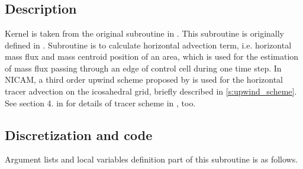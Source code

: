 \section{}

\subsection{Description}

Kernel  is taken from the original subroutine
 in \NICAM.
%
This subroutine is originally defined in .
%
Subroutine  is to calculate horizontal advection
term, i.e. horizontal mass flux and mass centroid position of an area,
which is used for the estimation of mass flux passing through an edge of control cell during one time step.
%
In NICAM, a third order upwind scheme proposed by \cite{Miura:2007bs} is used
for the horizontal tracer advection on the icosahedral grid, briefly
described in \autoref{s:upwind_scheme}.
See section 4. in \cite{Tomita2010ecmwf} for details of tracer scheme in \NICAM, too.



\subsection{Discretization and code}

Argument lists and local variables definition part of this subroutine is
as follows.

